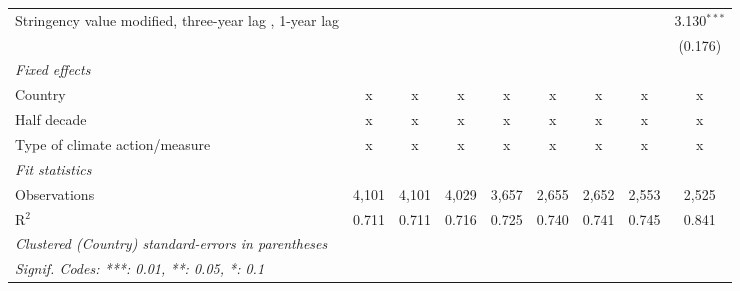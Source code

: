 \begin{table}[htbp]
\begin{tabular}{lcccccccc}
      Stringency value modified, three-year lag , 1-year lag                            &               &               &              &             &         &              &             & 3.130$^{***}$\\   
                                                                                        &               &               &              &             &         &              &             & (0.176)\\   
      \emph{Fixed effects}\\
      Country                                                                           & x             & x             & x            & x           & x       & x            & x           & x\\  
      Half decade                                                                       & x             & x             & x            & x           & x       & x            & x           & x\\  
      Type of climate action/measure                                                    & x             & x             & x            & x           & x       & x            & x           & x\\  
      \midrule \emph{Fit statistics}\\
      Observations                                                                      & 4,101         & 4,101         & 4,029        & 3,657       & 2,655   & 2,652        & 2,553       & 2,525\\  
      R$^2$                                                                             & 0.711         & 0.711         & 0.716        & 0.725       & 0.740   & 0.741        & 0.745       & 0.841\\  
      \midrule
      \multicolumn{9}{l}{\emph{Clustered (Country) standard-errors in parentheses}}\\
      \multicolumn{9}{l}{\emph{Signif. Codes: ***: 0.01, **: 0.05, *: 0.1}}\\
   \end{tabular}
\end{table}


